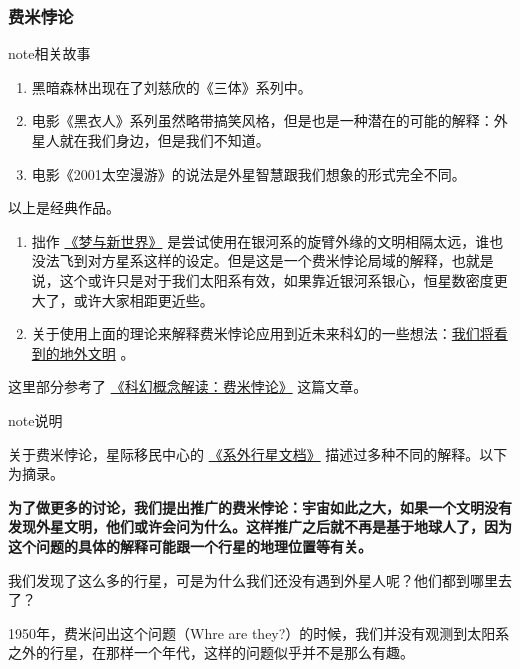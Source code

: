 \documentclass[letterpaper,10pt,english]{sphinxmanual}
\begin{document}
\subsubsection{费米悖论}
\label{physics:id15}
\begin{notice}{note}{相关故事}
\begin{enumerate}
\item {} 
黑暗森林出现在了刘慈欣的《三体》系列中。

\item {} 
电影《黑衣人》系列虽然略带搞笑风格，但是也是一种潜在的可能的解释：外星人就在我们身边，但是我们不知道。

\item {} 
电影《2001太空漫游》的说法是外星智慧跟我们想象的形式完全不同。

\end{enumerate}

以上是经典作品。
\begin{enumerate}
\item {} 
拙作 \href{http://multiverse.lamost.org/blog/6455}{《梦与新世界》} 是尝试使用在银河系的旋臂外缘的文明相隔太远，谁也没法飞到对方星系这样的设定。但是这是一个费米悖论局域的解释，也就是说，这个或许只是对于我们太阳系有效，如果靠近银河系银心，恒星数密度更大了，或许大家相距更近些。

\item {} 
关于使用上面的理论来解释费米悖论应用到近未来科幻的一些想法：\href{http://www.guokr.com/blog/793766/}{我们将看到的地外文明} 。

\end{enumerate}

这里部分参考了 \href{http://www.guokr.com/article/283356/}{《科幻概念解读：费米悖论》} 这篇文章。
\end{notice}

\begin{notice}{note}{说明}

关于费米悖论，星际移民中心的 \href{http://interimm.org/exoplanets}{《系外行星文档》} 描述过多种不同的解释。以下为摘录。

\textbf{为了做更多的讨论，我们提出推广的费米悖论：宇宙如此之大，如果一个文明没有发现外星文明，他们或许会问为什么。这样推广之后就不再是基于地球人了，因为这个问题的具体的解释可能跟一个行星的地理位置等有关。}
\end{notice}

我们发现了这么多的行星，可是为什么我们还没有遇到外星人呢？他们都到哪里去了？

1950年，费米问出这个问题（Whre are they?）的时候，我们并没有观测到太阳系之外的行星，在那样一个年代，这样的问题似乎并不是那么有趣。
\end{document}
